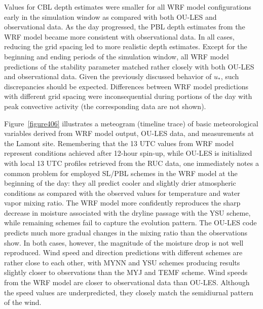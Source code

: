 Values for CBL depth estimates were smaller for all WRF model configurations early in the simulation window as compared with both OU-LES and observational data. As the day progressed, the PBL depth estimates from the WRF model became more consistent with observational data. In all cases, reducing the grid spacing led to more realistic depth estimates. Except for the beginning and ending periods of the simulation window, all WRF model predictions of the stability parameter matched rather closely with both OU-LES and observational data. Given the previously discussed behavior of $u_*$, such discrepancies should be expected. Differences between WRF model predictions with different grid spacing were inconsequential during portions of the day with peak convective activity (the corresponding data are not shown). 

Figure~\ref{figure406} illustrates a meteogram (timeline trace) of basic meteorological variables derived from WRF model output, OU-LES data, and measurements at the Lamont site. Remembering that the 13 UTC values from WRF model represent conditions achieved after 12-hour spin-up, while OU-LES is initialized with local 13 UTC profiles retrieved from the RUC data, one immediately notes a common problem for employed SL\slash PBL schemes in the WRF model at the beginning of the day: they all predict cooler and slightly drier atmospheric conditions as compared with the observed values for temperature and water vapor mixing ratio. The WRF model more confidently reproduces the sharp decrease in moisture associated with the dryline passage with the YSU scheme, while remaining schemes fail to capture the evolution pattern. The OU-LES code predicts much more gradual changes in the mixing ratio than the observations show. In both cases, however, the magnitude of the moisture drop is not well reproduced. Wind speed and direction predictions with different schemes are rather close to each other, with MYNN and YSU schemes producing results slightly closer to observations than the MYJ and TEMF scheme. Wind speeds from the WRF model are closer to observational data than OU-LES. Although the speed values are underpredicted, they closely match the semidiurnal pattern of the wind. 


